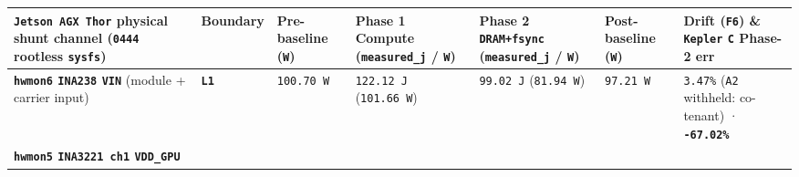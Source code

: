 \documentclass[10pt,letterpaper]{article}
\begin{document}
{\scriptsize\setlength{\tabcolsep}{3.0pt}\renewcommand{\arraystretch}{1.14}
\begin{longtable}[]{@{}
  >{\raggedright\arraybackslash}p{}
  >{\centering\arraybackslash}p{}
  >{\raggedleft\arraybackslash}p{}
  >{\raggedleft\arraybackslash}p{}
  >{\raggedleft\arraybackslash}p{}
  >{\raggedleft\arraybackslash}p{}
  >{\raggedright\arraybackslash}p{}@{}}
\toprule\noalign{}
\begin{minipage}[b]{\linewidth}\raggedright
\textbf{\texttt{Jetson\ AGX\ Thor} physical shunt channel (\texttt{0444}
rootless \texttt{sysfs})}
\end{minipage} & \begin{minipage}[b]{\linewidth}\centering
\textbf{Boundary}
\end{minipage} & \begin{minipage}[b]{\linewidth}\raggedleft
\textbf{Pre-baseline (\texttt{W})}
\end{minipage} & \begin{minipage}[b]{\linewidth}\raggedleft
\textbf{Phase 1 Compute (\texttt{measured\_\allowbreak{}j} / \texttt{W})}
\end{minipage} & \begin{minipage}[b]{\linewidth}\raggedleft
\textbf{Phase 2 \texttt{DRAM+fsync} (\texttt{measured\_\allowbreak{}j} / \texttt{W})}
\end{minipage} & \begin{minipage}[b]{\linewidth}\raggedleft
\textbf{Post-baseline (\texttt{W})}
\end{minipage} & \begin{minipage}[b]{\linewidth}\raggedright
\textbf{Drift (\texttt{F6}) \& \texttt{Kepler} \texttt{C} Phase-2 err}
\end{minipage} \\
\midrule\noalign{}
\endhead
\bottomrule\noalign{}
\endlastfoot
\textbf{\texttt{hwmon6} \texttt{INA238} \texttt{VIN}} (module + carrier
input) & \textbf{\texttt{L1}} & \texttt{100.70\ W} & \texttt{122.12\ J}
(\texttt{101.66\ W}) & \texttt{99.02\ J} (\texttt{81.94\ W}) &
\texttt{97.21\ W} & \texttt{3.47\%} (\texttt{A2} withheld: co-tenant) ·
\textbf{\texttt{-67.02\%}} \\
\textbf{\texttt{hwmon5} \texttt{INA3221\ ch1} \texttt{VDD\_GPU}}

\end{longtable}}
\end{document}
